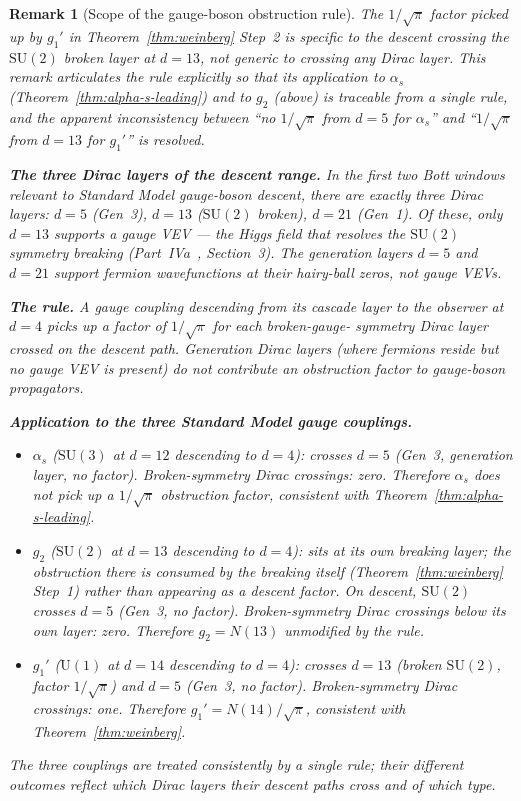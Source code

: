 \documentclass[12pt,a4paper]{article}
\newtheorem*{remark}{Remark}
\begin{document}
\begin{remark}[Scope of the gauge-boson obstruction rule]\label{rem:obstruction-scope}
The $1/\sqrt{\pi}$ factor picked up by $g_1'$ in
Theorem~\ref{thm:weinberg} Step~2 is specific to the descent crossing
the $\mathrm{SU}(2)$ broken layer at $d=13$, not generic to crossing
any Dirac layer. This remark articulates the rule explicitly so that
its application to $\alpha_s$ (Theorem~\ref{thm:alpha-s-leading}) and
to $g_2$ (above) is traceable from a single rule, and the apparent
inconsistency between ``no $1/\sqrt{\pi}$ from $d=5$ for $\alpha_s$''
and ``$1/\sqrt{\pi}$ from $d=13$ for $g_1'$'' is resolved.

\medskip\noindent\textbf{The three Dirac layers of the descent range.}
In the first two Bott windows relevant to Standard Model gauge-boson
descent, there are exactly three Dirac layers: $d=5$ (Gen~3), $d=13$
($\mathrm{SU}(2)$ broken), $d=21$ (Gen~1). Of these, only $d=13$
supports a gauge VEV --- the Higgs field that resolves the
$\mathrm{SU}(2)$ symmetry breaking (Part~IVa~\cite{part4a}, Section~3).
The generation layers $d=5$ and $d=21$ support fermion wavefunctions at
their hairy-ball zeros, not gauge VEVs.

\medskip\noindent\textbf{The rule.}
A gauge coupling descending from its cascade layer to the observer at
$d=4$ picks up a factor of $1/\sqrt{\pi}$ for each \emph{broken-gauge-
symmetry} Dirac layer crossed on the descent path. Generation Dirac
layers (where fermions reside but no gauge VEV is present) do not
contribute an obstruction factor to gauge-boson propagators.

\medskip\noindent\textbf{Application to the three Standard Model gauge couplings.}
\begin{itemize}[nosep]
\item $\alpha_s$ ($\mathrm{SU}(3)$ at $d=12$ descending to $d=4$):
crosses $d=5$ (Gen~3, generation layer, no factor). Broken-symmetry
Dirac crossings: zero. Therefore $\alpha_s$ does not pick up a
$1/\sqrt{\pi}$ obstruction factor, consistent with
Theorem~\ref{thm:alpha-s-leading}.
\item $g_2$ ($\mathrm{SU}(2)$ at $d=13$ descending to $d=4$): sits at
its own breaking layer; the obstruction there is consumed by the
breaking itself (Theorem~\ref{thm:weinberg} Step~1) rather than
appearing as a descent factor. On descent, $\mathrm{SU}(2)$ crosses
$d=5$ (Gen~3, no factor). Broken-symmetry Dirac crossings below its
own layer: zero. Therefore $g_2 = N(13)$ unmodified by the rule.
\item $g_1'$ ($\mathrm{U}(1)$ at $d=14$ descending to $d=4$): crosses
$d=13$ (broken $\mathrm{SU}(2)$, factor $1/\sqrt{\pi}$) and $d=5$
(Gen~3, no factor). Broken-symmetry Dirac crossings: one. Therefore
$g_1' = N(14)/\sqrt{\pi}$, consistent with
Theorem~\ref{thm:weinberg}.
\end{itemize}
The three couplings are treated consistently by a single rule; their
different outcomes reflect which Dirac layers their descent paths
cross and of which type.


\end{remark}
\end{document}
